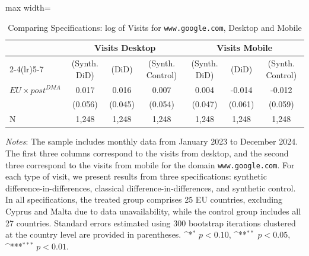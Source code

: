 \documentclass[11pt]{article}
\begin{document}
	
	
	\begin{table}[ht!]
		\centering
		\def\sym#1{\ifmmode^{#1}\else\(^{#1}\)\fi}
		\caption{\label{tab:sdid_traffic_google} Comparing Specifications: log of Visits for \texttt{www.google.com}, Desktop and Mobile}
		\begin{threeparttable}
			\begin{adjustbox}{max width=\linewidth}
				\begin{tabular}{lcccccc}
					\hline \noalign{\smallskip} 
					& \multicolumn{3}{c}{Visits Desktop} & \multicolumn{3}{c}{Visits Mobile}  \\ \cmidrule(lr){2-4}\cmidrule(lr){5-7}
				
				&(Synth. DiD)   &       (DiD)   &(Synth. Control)   &(Synth. DiD)   &       (DiD)   &(Synth. Control)   \\
				\midrule
				$ EU \times post^{DMA} $ &       0.017   &       0.016   &       0.007   &       0.004   &      -0.014   &      -0.012   \\
				&     (0.056)   &     (0.045)   &     (0.054)   &     (0.047)   &     (0.061)   &     (0.059)   \\
				
				N                   &       1,248   &       1,248   &       1,248   &       1,248   &       1,248   &       1,248   \\
				\midrule
				
				\end{tabular}
			\end{adjustbox}
			\begin{tablenotes}
				\item \footnotesize \emph{Notes}: The sample includes monthly data from January 2023 to December 2024. The first three columns correspond to the visits from desktop, and the second three correspond to the visits from mobile for the domain \texttt{www.google.com}. For each type of visit, we present results from three specifications: synthetic difference-in-differences, classical difference-in-differences, and synthetic control. In all specifications, the treated group comprises 25 EU countries, excluding Cyprus and Malta due to data unavailability, while the control group includes all 27 countries. Standard errors estimated using 300 bootstrap iterations clustered at the country level are provided in parentheses. \sym{*} \(p<0.10\), \sym{**} \(p<0.05\), \sym{***}  \(p<0.01\). 
			\end{tablenotes}
		\end{threeparttable}
	\end{table}
	
\end{document}
